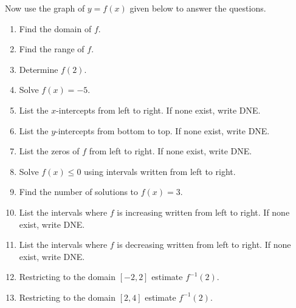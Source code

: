 \documentclass{ximera}
\author{Carl Stitz \and Jeff Zeager \and Bart Snapp \and Matthew Carr}
\begin{document}
\begin{exercise}




Now use the graph of $y = f(x)$ given below to answer the questions.
\begin{image}
\end{image}
\begin{multicols}{2}
\begin{enumerate}
\item  Find the domain of $f$. \label{usesecondfuncgraphfirst}
\item  Find the range of $f$.
\item  Determine $f(2)$.
\item  Solve $f(x) = -5$.
\item  List the $x$-intercepts from left to right. If none exist, write DNE.
\item  List the $y$-intercepts from bottom to top. If none exist, write DNE.
\item  List the zeros of $f$ from left to right. If none exist, write DNE.
\item  Solve $f(x) \leq 0$ using intervals written from left to right.
\item  Find the number of solutions to $f(x) = 3$.
\item  List the intervals where $f$ is increasing written from left to right. If none exist, write DNE.
\item  List the intervals where $f$ is decreasing written from left to right. If none exist, write DNE.
\item  Restricting to the domain $[-2,2]$ estimate $f^{-1}(2)$.
\item  Restricting to the domain $[2,4]$ estimate $f^{-1}(2)$.
\end{enumerate}
\end{multicols}


\end{exercise}
\end{document}
